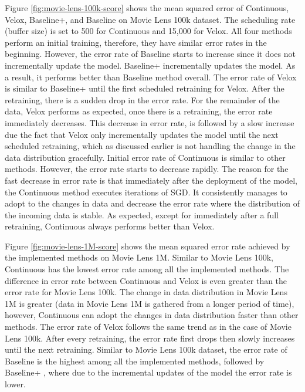 \documentclass{vldb}
\begin{document}
Figure \ref{fig:movie-lens-100k-score} shows the mean squared error of Continuous, Velox, Baseline+, and Baseline on Movie Lens 100k dataset.
The scheduling rate (buffer size) is set to 500 for Continuous and 15,000 for Velox.
All four methods perform an initial training, therefore, they have similar error rates in the beginning.
However, the error rate of Baseline starts to increase since it does not incrementally update the model.
Baseline+ incrementally updates the model.
As a result, it performs better than Baseline method overall.
The error rate of Velox is similar to Baseline+ until the first scheduled retraining for Velox.
After the retraining, there is a sudden drop in the error rate.
For the remainder of the data, Velox performs as expected, once there is a retraining, the error rate immediately decreases.
This decrease in error rate, is followed by a slow increase due the fact that Velox only incrementally updates the model until the next scheduled retraining, which as discussed earlier is not handling the change in the data distribution gracefully.
Initial error rate of Continuous is similar to other methods.
However, the error rate starts to decrease rapidly.
The reason for the fast decrease in error rate is that immediately after the deployment of the model, the Continuous method executes iterations of SGD.
It consistently manages to adopt to the changes in data and decrease the error rate where the distribution of the incoming data is stable.
As expected, except for immediately after a full retraining, Continuous always performs better than Velox.

Figure \ref{fig:movie-lens-1M-score} shows the mean squared error rate achieved by the implemented methods on Movie Lens 1M.
Similar to Movie Lens 100k, Continuous has the lowest error rate among all the implemented methods.
The difference in error rate between Continuous and Velox is even greater than the error rate for Movie Lens 100k.
The change in data distribution in Movie Lens 1M is greater (data in Movie Lens 1M is gathered from a longer period of time), however,  Continuous can adopt the changes in data distribution faster than other methods.
The error rate of Velox follows the same trend as in the case of Movie Lens 100k. 
After every retraining, the error rate first drops then slowly increases until the next retraining.
Similar to Movie Lens 100k dataset, the error rate of Baseline is the highest among all the implemented methods, followed by Baseline+ , where due to the incremental updates of the model the error rate is lower.
\end{document}
